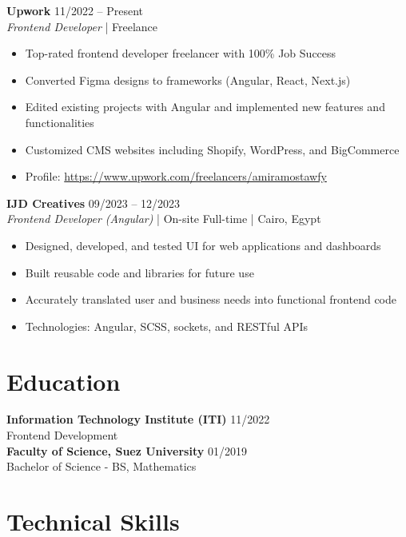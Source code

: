 \documentclass[11pt,a4paper]{article}
\begin{document}
\noindent\textbf{Upwork} \hfill 11/2022 -- Present\\
\textit{Frontend Developer} | Freelance\\
\begin{itemize}
    \item Top-rated frontend developer freelancer with 100\% Job Success
    \item Converted Figma designs to frameworks (Angular, React, Next.js)
    \item Edited existing projects with Angular and implemented new features and functionalities
    \item Customized CMS websites including Shopify, WordPress, and BigCommerce
    \item Profile: \url{https://www.upwork.com/freelancers/amiramostawfy}
\end{itemize}

\vspace{0.2cm}

\noindent\textbf{IJD Creatives} \hfill 09/2023 -- 12/2023\\
\textit{Frontend Developer (Angular)} | On-site Full-time | Cairo, Egypt\\
\begin{itemize}
    \item Designed, developed, and tested UI for web applications and dashboards
    \item Built reusable code and libraries for future use
    \item Accurately translated user and business needs into functional frontend code
    \item Technologies: Angular, SCSS, sockets, and RESTful APIs
\end{itemize}

\section*{Education}
\noindent\textbf{Information Technology Institute (ITI)} \hfill 11/2022\\
Frontend Development\\

\noindent\textbf{Faculty of Science, Suez University} \hfill 01/2019\\
Bachelor of Science - BS, Mathematics\\

\section{Technical Skills}
\end{document}
